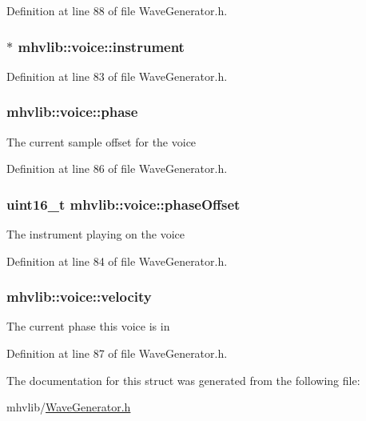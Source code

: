 Definition at line 88 of file Wave\-Generator.\-h.

\hypertarget{structmhvlib_1_1voice_a702216bc037445fb09efa34941ab7954}{
\subsubsection[{instrument}]{$\ast$ mhvlib\-::voice\-::instrument}}\label{structmhvlib_1_1voice_a702216bc037445fb09efa34941ab7954}


Definition at line 83 of file Wave\-Generator.\-h.

\hypertarget{structmhvlib_1_1voice_ab4625a7fc487c0714ce1d1ac54c750c8}{
\subsubsection[{phase}]{ mhvlib\-::voice\-::phase}}\label{structmhvlib_1_1voice_ab4625a7fc487c0714ce1d1ac54c750c8}
The current sample offset for the voice 

Definition at line 86 of file Wave\-Generator.\-h.

\hypertarget{structmhvlib_1_1voice_ab4a07d07daa117761b94659f95e0a846}{
\subsubsection[{phase\-Offset}]{\setlength{\rightskip}{0pt plus 5cm}uint16\-\_\-t mhvlib\-::voice\-::phase\-Offset}}\label{structmhvlib_1_1voice_ab4a07d07daa117761b94659f95e0a846}
The instrument playing on the voice 

Definition at line 84 of file Wave\-Generator.\-h.

\hypertarget{structmhvlib_1_1voice_a0d7297d68b1a2f76d7b1e7cc010cd4a9}{
\subsubsection[{velocity}]{ mhvlib\-::voice\-::velocity}}\label{structmhvlib_1_1voice_a0d7297d68b1a2f76d7b1e7cc010cd4a9}
The current phase this voice is in 

Definition at line 87 of file Wave\-Generator.\-h.



The documentation for this struct was generated from the following file\-:\begin{DoxyCompactItemize}
\item 
mhvlib/\hyperlink{_wave_generator_8h}{Wave\-Generator.\-h}\end{DoxyCompactItemize}

